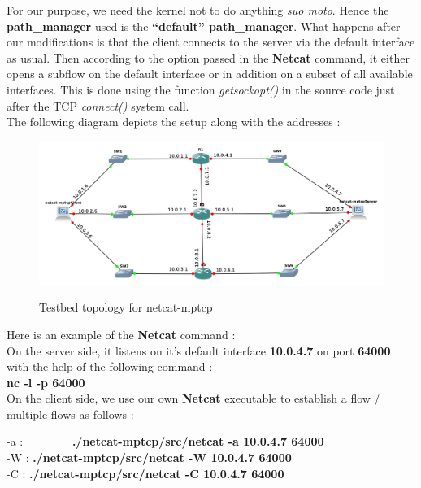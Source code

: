 \documentclass[a4paper,11pt]{article}
\begin{document}
			For our purpose, we need the kernel not to do anything \emph{suo moto}. Hence the \textbf{path\_manager} used is the \textbf{``default'' path\_manager}. What happens after our modifications is that the client connects to the server via the default interface as usual. Then according to the option passed in the \textbf{Netcat} command, it either opens a subflow on the default interface or in addition on a subset of all available interfaces. This is done using the function \emph{getsockopt()} in the source code just after the TCP \emph{connect()} system call. \\
			The following diagram depicts the setup along with the addresses :
			\begin{figure}[h]
				\begin{center}
					\label{fig:topology}
					\includegraphics[scale=0.45]{pictures/topologie.jpg}
					\caption[]{Testbed topology for netcat-mptcp}
				\end{center}
			\end{figure}

			Here is an example of the \textbf{Netcat} command : \\
			On the server side, it listens on it's default interface \textbf{10.0.4.7} on port \textbf{64000} with the help of the following command : \\

			\textbf{nc -l -p 64000} \\

			On the client side, we use our own \textbf{Netcat} executable to establish a flow / multiple flows as follows :

			
			\begin{tabbing}
			-a : ~~~~~~~~\=\textbf{./netcat-mptcp/src/netcat -a 10.0.4.7 64000} \\
			-W : \> \textbf{./netcat-mptcp/src/netcat -W 10.0.4.7 64000} \\
			-C : \> \textbf{./netcat-mptcp/src/netcat -C 10.0.4.7 64000}
			\end{tabbing}
\end{document}
